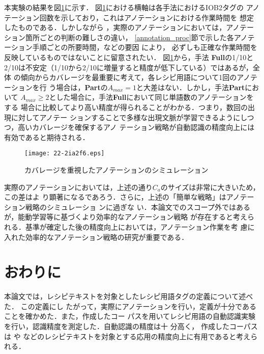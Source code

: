 \documentclass[japanese]{jnlp_1.4}
\begin{document}
本実験の結果を図\ref{figure_partgraph}に示す．
図\ref{figure_partgraph}における横軸は各手法におけるIOB2タグの
アノテーション回数を示しており，これはアノテーションにおける作業時間を
想定したものである．しかしながら
，実際のアノテーションにおいては，アノテーション箇所ごとの判断の難しさの違い，
\ref{annotation_proc}節で示した各アノテーション手順ごとの所要時間，などの要因
により，
必ずしも正確な作業時間を反映しているものではないことに留意されたい．
図\ref{figure_partgraph}から，手法{\bf
Full}の1/10と2/10は不安定（1/10から2/10に増量すると精度が低下している）ではあるが，全体
の傾向からカバレージを最重要に考えて，各レシピ用語について1回のアノテーションを行
う場合は，{\bf Part}の$A_{max} = 1$と大差はない．しかし，手法{\bf Part}において
$A_{max} \geq 2$とした場合に，手法{\bf Full}において同じ単語数のアノテーションをする
場合に比較してより高い精度が得られることがわかる．つまり，数回の出現に対してアノテー
ションすることで多様な出現文脈が学習できるようにしつつ，高いカバレージを確保するアノ
テーション戦略が自動認識の精度向上には有効であると期待される．

\begin{figure}[t]
  \begin{center}
\texttt{[image: 22-2ia2f6.eps]}
  \end{center}
  \caption{カバレージを重視したアノテーションのシミュレーション}
  \label{figure_partgraph}
\end{figure}

実際のアノテーションにおいては，上述の通り$C_a$のサイズは非常に大きいため，この差はよ
り顕著になるであろう．さらに，上述の「簡単な戦略」はアノテーション戦略のシミュレーショ
ンに過ぎな
い．本論文でのスコープ外ではあるが，能動学習等に基づくより効率的なアノテーション戦略
が存在すると考えられる．基準が確定した後の精度向上においては，アノテーション作業を考
慮に入れた効率的なアノテーション戦略の研究が重要である．


\section{おわりに}

本論文では，レシピテキストを対象としたレシピ用語タグの定義について述べた．
この定義にし
たがって，実際にアノテーションを行い，定義が十分であることを確かめた．また，作成したコー
パスを用いてレシピ用語の自動認識実験を行い，認識精度を測定した．自動認識の精度は十
分高く，
作成したコーパスは
\cite{Structural.Analysis.of.Cooking.Preparation.Steps.in.Japanese}
や
\cite{Translating.Video.Content.to.Natural.Language.Descriptions,Unsupervised.Alignment.of.Natural.Language.Instructions.with.Video.Segments}
などのレシピテキストを対象とする応用の精度向上に有用であると考えられる．
\end{document}
